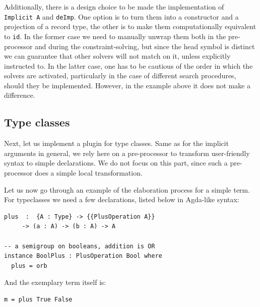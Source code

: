 \documentclass[
  sigconf,
  screen,
  review]{acmart}
\begin{document}
Additionally, there is a design choice to be made the implementation of
\texttt{Implicit\ A} and \texttt{deImp}. One option is to turn them into
a constructor and a projection of a record type, the other is to make
them computationally equivalent to \texttt{id}. In the former case we
need to manually unwrap them both in the pre-processor and during the
constraint-solving, but since the head symbol is distinct we can
guarantee that other solvers will not match on it, unless explicitly
instructed to. In the latter case, one has to be cautious of the order
in which the solvers are activated, particularly in the case of
different search procedures, should they be implemented. However, in the
example above it does not make a difference.

\hypertarget{sec:case-typeclasses}{%
\subsection{Type classes}\label{sec:case-typeclasses}}

Next, let us implement a plugin for type classes. Same as for the
implicit arguments in general, we rely here on a pre-processor to
transform user-friendly syntax to simple declarations. We do not focus
on this part, since such a pre-processor does a simple local
transformation.

Let us now go through an example of the elaboration process for a simple
term. For typeclasses we need a few declarations, listed below in
Agda-like syntax:

\begin{verbatim}
plus  :  {A : Type} -> {{PlusOperation A}}
     -> (a : A) -> (b : A) -> A

-- a semigroup on booleans, addition is OR
instance BoolPlus : PlusOperation Bool where
  plus = orb
\end{verbatim}

And the exemplary term itself is:

\begin{verbatim}
m = plus True False
\end{verbatim}
\end{document}
